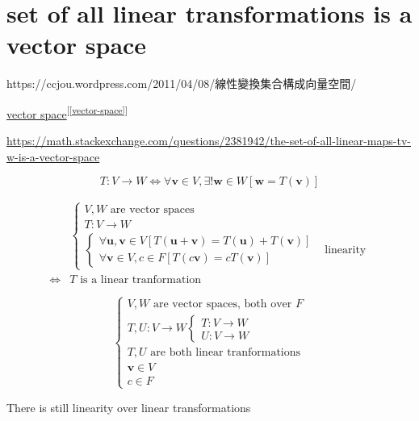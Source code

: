 \documentclass[
]{book}
\theoremstyle{definition}
\theoremstyle{definition}
\theoremstyle{definition}
\theoremstyle{definition}
\theoremstyle{remark}
\begin{document}
\section{set of all linear transformations is a vector space}\label{set-of-all-linear-transformations-is-a-vector-space}

\begin{CJK}{UTF8}{bsmi}
https://ccjou.wordpress.com/2011/04/08/線性變換集合構成向量空間/
\end{CJK}

\hyperref[vector-space]{vector space}\textsuperscript{{[}\ref{vector-space}{]}}

\url{https://math.stackexchange.com/questions/2381942/the-set-of-all-linear-maps-tv-w-is-a-vector-space}

\[
    T:V\rightarrow W
\Leftrightarrow \forall\boldsymbol{v}\in V,\exists!\boldsymbol{w}\in W\left[\boldsymbol{w}=T\left(\boldsymbol{v}\right)\right]
\]

\[
\begin{aligned}
 & \begin{cases}
V,W\text{ are vector spaces}\\
T:V\rightarrow W\\
\begin{cases}
\forall\boldsymbol{u},\boldsymbol{v}\in V\left[T\left(\boldsymbol{u}+\boldsymbol{v}\right)=T\left(\boldsymbol{u}\right)+T\left(\boldsymbol{v}\right)\right]\\
\forall\boldsymbol{v}\in V,c\in F\left[T\left(c\boldsymbol{v}\right)=cT\left(\boldsymbol{v}\right)\right]
\end{cases} & \text{linearity}
\end{cases}\\
\Leftrightarrow & T\text{ is a linear tranformation}
\end{aligned}
\]

\[
\begin{cases}
V,W\text{ are vector spaces, both over }F\\
T,U:V\rightarrow W\begin{cases}
T:V\rightarrow W\\
U:V\rightarrow W
\end{cases}\\
T,U\text{ are both linear tranformations}\\
\boldsymbol{v}\in V\\
c\in F
\end{cases}
\]

There is still linearity over linear transformations
\end{document}
